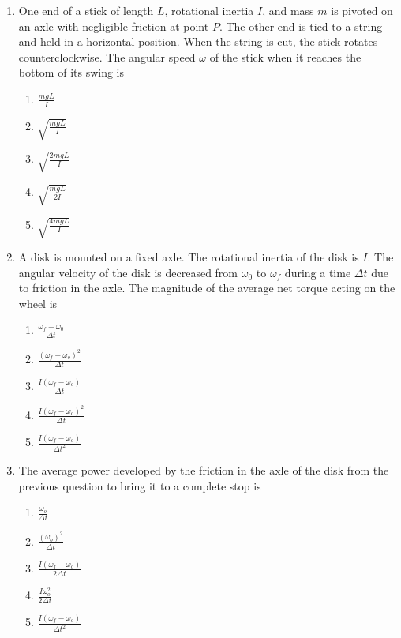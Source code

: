 \documentclass{../../../oss-apphys}
\begin{document}
\begin{multicols}{2}
\begin{enumerate}[leftmargin=18pt]
  \item One end of a stick of length $L$, rotational inertia $I$, and mass $m$
    is pivoted on an axle with negligible friction at point $P$. The other end
    is tied to a string and held in a horizontal position. When the string is
    cut, the stick rotates counterclockwise. The angular speed $\omega$ of the
    stick when it reaches the bottom of its swing is
    \begin{center}
    \end{center}
    \begin{enumerate}[noitemsep,topsep=0pt,leftmargin=18pt,label=(\Alph*)]
    \item$\displaystyle\frac{mgL}{I}$
    \item$\displaystyle\sqrt{\frac{mgL}{I}}$
    \item$\displaystyle\sqrt{\frac{2mgL}{I}}$
    \item$\displaystyle\sqrt{\frac{mgL}{2I}}$
    \item$\displaystyle\sqrt{\frac{4mgL}{I}}$
    \end{enumerate}

  \item A disk is mounted on a fixed axle. The rotational inertia of the disk is
    $I$. The angular velocity of the disk is decreased from $\omega_0$ to
    $\omega_f$ during a time $\Delta t$ due to friction in the axle. The
    magnitude of the average net torque acting on the wheel is
    \begin{enumerate}[noitemsep,topsep=0pt,leftmargin=18pt,label=(\Alph*)]
    \item $\displaystyle\frac{\omega_f-\omega_0}{\Delta t}$
    \item $\displaystyle\frac{(\omega_f-\omega_o)^2}{\Delta t}$
    \item $\displaystyle\frac{I(\omega_f-\omega_o)}{\Delta t}$
    \item $\displaystyle\frac{I(\omega_f-\omega_o)^2}{\Delta t}$
    \item $\displaystyle\frac{I(\omega_f-\omega_o)}{\Delta t^2}$
    \end{enumerate}
    \columnbreak
    
  \item The average power developed by the friction in the axle of the disk
    from the previous question to bring it to a complete stop is
    \begin{enumerate}[noitemsep,topsep=0pt,leftmargin=18pt,label=(\Alph*)]
    \item $\displaystyle\frac{\omega_o}{\Delta t}$
    \item $\displaystyle\frac{(\omega_o)^2}{\Delta t}$
    \item $\displaystyle\frac{I(\omega_f-\omega_o)}{2\Delta t}$
    \item $\displaystyle\frac{I\omega_o^2}{2\Delta t}$
    \item $\displaystyle\frac{I(\omega_f-\omega_o)}{\Delta t^2}$
    \end{enumerate}
    

\end{enumerate}
\end{multicols}
\end{document}
